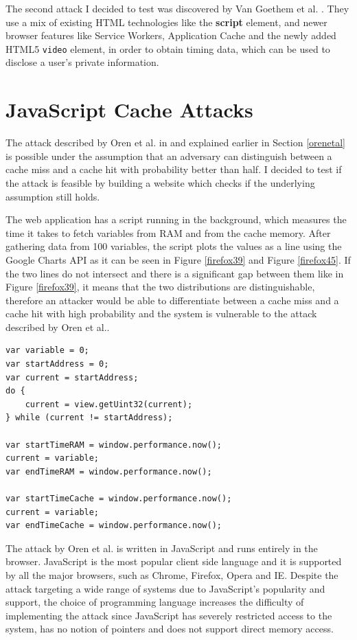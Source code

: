 \documentclass[10pt,a4paper,twoside]{book}
\begin{document}
The second attack I decided to test was discovered by Van Goethem et al. \cite{van2015clock}. They use a mix of existing HTML technologies like the \textbf{script} element, and newer browser features like Service Workers, Application Cache and the newly added HTML5 \texttt{video} element, in order to obtain timing data, which can be used to disclose a user's private information.


\section{JavaScript Cache Attacks}

The attack described by Oren et al. in \cite{oren2015spy} and explained earlier in Section \ref{orenetal} is possible under the assumption that an adversary can distinguish between a cache miss and a cache hit with probability better than half. I decided to test if the attack is feasible by building a website which checks if the underlying assumption still holds. 

The web application has a script running in the background, which measures the time it takes to fetch variables from RAM and from the cache memory. After gathering data from 100 variables, the script plots the values as a line using the Google Charts API \cite{googlecharts} as it can be seen in Figure \ref{firefox39} and Figure \ref{firefox45}. If the two lines do not intersect and there is a significant gap between them like in Figure \ref{firefox39}, it means that the two distributions are distinguishable, therefore an attacker would be able to differentiate between a cache miss and a cache hit with high probability and the system is vulnerable to the attack described by Oren et al.\cite{oren2015spy}. 

\begin{lstlisting}[caption={Code for comparing access times from RAM vs Cache},label={orentest},  xleftmargin=0.7cm]
var variable = 0;
var startAddress = 0;
var current = startAddress;
do {
	current = view.getUint32(current);
} while (current != startAddress);

var startTimeRAM = window.performance.now();
current = variable;
var endTimeRAM = window.performance.now();

var startTimeCache = window.performance.now();
current = variable;
var endTimeCache = window.performance.now();
\end{lstlisting}

The attack by Oren et al. is written in JavaScript and runs entirely in the browser. JavaScript is the most popular client side language and it is supported by all the major browsers, such as Chrome, Firefox, Opera and IE. Despite the attack targeting a wide range of systems due to JavaScript's popularity and support, the choice of programming language increases the difficulty of implementing the attack since JavaScript has severely restricted access to the system, has no notion of pointers and does not support direct memory access.
\end{document}
